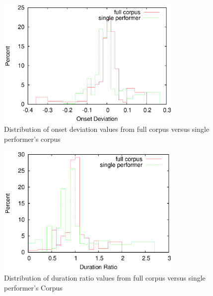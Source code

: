\begin{figure}[tp]
   \begin{center}
      \includegraphics[width=0.8\textwidth]{fig/all_01_onset}
   \end{center}
   \caption{Distribution of onset deviation values from full corpus versus single performer's corpus}
   \label{fig:distonset}
\end{figure}
\begin{figure}[tp]
   \begin{center}
      \includegraphics[width=0.8\textwidth]{fig/all_01_duration}
   \end{center}
   \caption{Distribution of duration ratio values from full corpus versus single performer's Corpus}
   \label{fig:distdur}
\end{figure}
